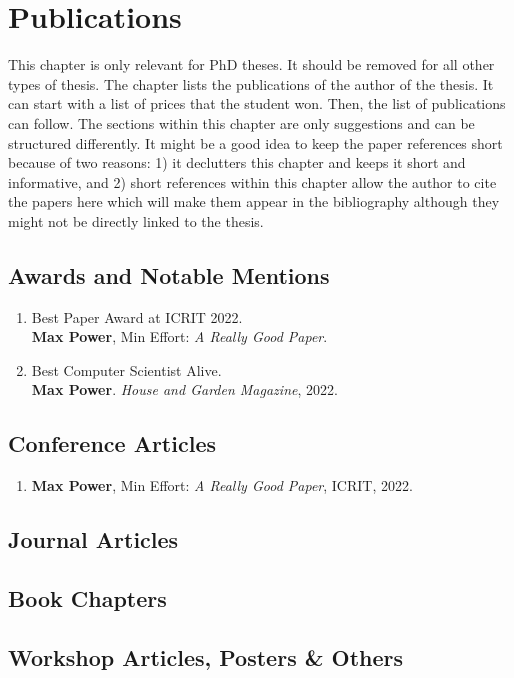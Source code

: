 \chapter*{Publications}

This chapter is only relevant for PhD theses. It should be removed for all other types of thesis. The chapter lists the publications of the author of the thesis. It can start with a list of prices that the student won. Then, the list of publications can follow. The sections within this chapter are only suggestions and can be structured differently. It might be a good idea to keep the paper references short because of two reasons: 1) it declutters this chapter and keeps it short and informative, and 2) short references within this chapter allow the author to cite the papers here which will make them appear in the bibliography although they might not be directly linked to the thesis.

\section*{Awards and Notable Mentions}

\begin{enumerate}
\item Best Paper Award at ICRIT 2022.\\
\textbf{Max Power}, Min Effort:
\emph{A Really Good Paper}.
\item Best Computer Scientist Alive.\\
\textbf{Max Power}.
\emph{House and Garden Magazine}, 2022.
\end{enumerate}

\section*{Conference Articles}

\begin{enumerate}
\item \textbf{Max Power}, Min Effort:
\emph{A Really Good Paper},
 ICRIT, 2022.~\cite{power2022}
\end{enumerate}

\section*{Journal Articles}

\section*{Book Chapters}

\section*{Workshop Articles, Posters \& Others}
